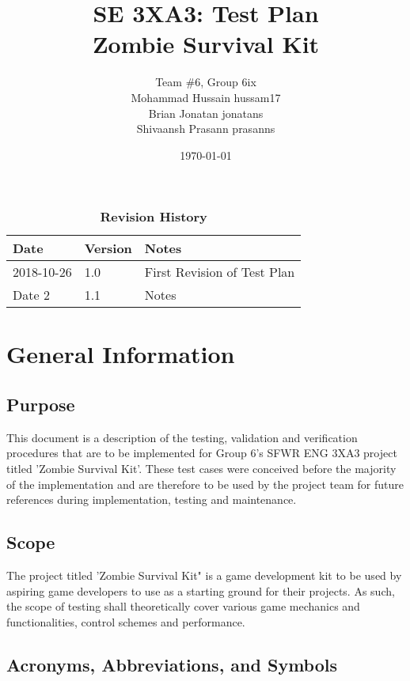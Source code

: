 \documentclass[12pt, titlepage]{article}
\title{SE 3XA3: Test Plan\\Zombie Survival Kit}
\author{Team \#6, Group 6ix
		\\ Mohammad Hussain hussam17
		\\ Brian Jonatan jonatans
		\\ Shivaansh Prasann prasanns
}
\date{\today}
\begin{document}
\maketitle

\tableofcontents
\listoftables
\listoffigures

\begin{table}[bp]
\caption{\bf Revision History}
\begin{tabularx}{\textwidth}{p{3cm}p{2cm}X}
\toprule {\bf Date} & {\bf Version} & {\bf Notes}\\
\midrule
2018-10-26 & 1.0 & First Revision of Test Plan\\
Date 2 & 1.1 & Notes\\
\bottomrule
\end{tabularx}
\end{table}

\newpage




\section{General Information}

\subsection{Purpose}
This document is a description of the testing, validation and verification procedures that are to be implemented for Group 6's SFWR ENG 3XA3 project titled 'Zombie Survival Kit'. These test cases were conceived before the majority of the implementation and are therefore to be used by the project team for future references during implementation, testing and maintenance.
\subsection{Scope}
The project titled 'Zombie Survival Kit" is a game development kit to be used by aspiring game developers to use as a starting ground for their projects. As such, the scope of testing shall theoretically cover various game mechanics and functionalities, control schemes and performance.
\subsection{Acronyms, Abbreviations, and Symbols}
\end{document}
